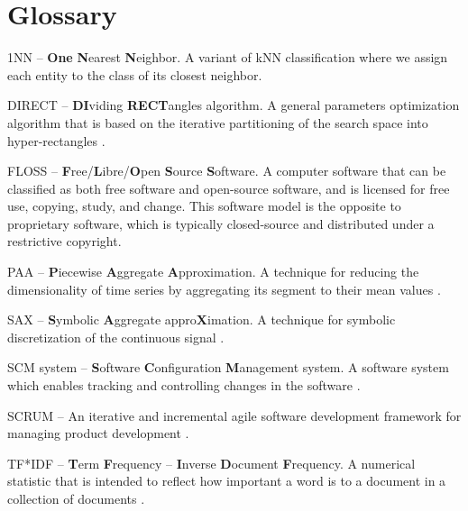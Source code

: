 \chapter*{Glossary}

\begin{list}{}{\setlength{}%
           \setlength\itemindent{-\leftmargin}%
           \let\makelabel\descriptionlabel}

\item[1NN] -- \textbf{One} \textbf{N}earest \textbf{N}eighbor. A variant of kNN classification where we assign each entity to the class of its closest neighbor.            
           
\item[DIRECT] -- \textbf{DI}viding \textbf{RECT}angles algorithm. A general parameters optimization algorithm that is based on the iterative partitioning of the search space into hyper-rectangles \cite{citeulike:4210208} \cite{citeulike:12563460}. 

\item[FLOSS] -- \textbf{F}ree/\textbf{L}ibre/\textbf{O}pen \textbf{S}ource \textbf{S}oftware. A computer software that can be classified as both free software and open-source software, and is licensed for free use, copying, study, and change. This software model is the opposite to proprietary software, which is typically closed-source and distributed under a restrictive copyright.

\item[PAA] -- \textbf{P}iecewise \textbf{A}ggregate \textbf{A}pproximation. A technique for reducing the dimensionality of time series by aggregating its segment to their mean values \cite{citeulike:2946589}.

\item[SAX] -- \textbf{S}ymbolic \textbf{A}ggregate appro\textbf{X}imation. A technique for symbolic discretization of the continuous signal \cite{citeulike:2821475}.

\item[SCM system] -- \textbf{S}oftware \textbf{C}onfiguration \textbf{M}anagement system. A software system which enables tracking and controlling changes in the software \cite{scm_book}.

\item[SCRUM] -- An iterative and incremental agile software development framework for managing product development \cite{Cohn_SCRUM}.

\item[TF*IDF] -- \textbf{T}erm \textbf{F}requency -- \textbf{I}nverse \textbf{D}ocument \textbf{F}requency. A numerical statistic that is intended to reflect how important a word is to a document in a collection of documents \cite{salton-71}. 


\end{list}
